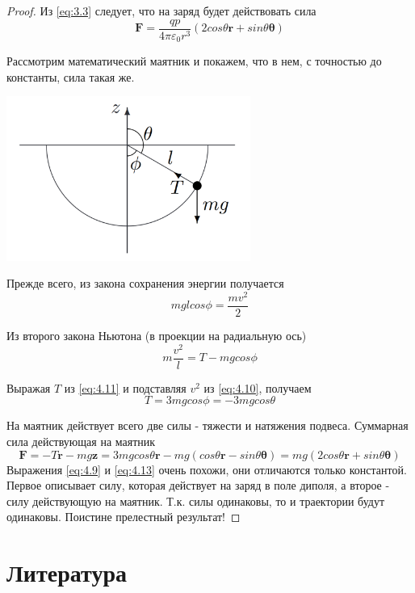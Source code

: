 \documentclass[a4paper,12pt]{article}
\newenvironment{solution}{\renewcommand{\proofname}{\unskip\indent\nopunct}\begin{proof}}{\end{proof}}
\numberwithin{equation}{section}
\begin{document}
\begin{solution}
Из \ref{eq:3.3} следует, что на заряд будет действовать сила
\begin{equation}\label{eq:4.9}
    \bm{F} = \frac{q p}{4 \pi \varepsilon_0 r^3} \left( 2 cos \theta \bm{r} + sin \theta \bm{\theta} \right)
\end{equation}

Рассмотрим математический маятник и покажем, что в нем, с точностью до константы, сила такая же.

\begin{center}
    \includegraphics[width=8cm]{3.png}
\end{center}

Прежде всего, из закона сохранения энергии получается
\begin{equation}\label{eq:4.10}
    mgl cos \phi = \frac{mv^2}{2}
\end{equation}

Из второго закона Ньютона (в проекции на радиальную ось)
\begin{equation}\label{eq:4.11}
    m \frac{v^2}{l} = T - mg cos \phi
\end{equation}

Выражая $T$ из \ref{eq:4.11} и подставляя $v^2$ из \ref{eq:4.10}, получаем
\begin{equation}
    T = 3mg cos \phi = -3mg cos \theta
\end{equation}

На маятник действует всего две силы - тяжести и натяжения подвеса.
Суммарная сила действующая на маятник
\begin{equation}\label{eq:4.13}
    \bm{F} = -T \bm{r} - mg \bm{z} = 3mg cos \theta \bm{r} - mg \left( cos \theta \bm{r} - sin \theta \bm{\theta} \right) =
    mg (2 cos \theta \bm{r} + sin \theta \bm{\theta})
\end{equation}
Выражения \ref{eq:4.9} и \ref{eq:4.13} очень похожи, они отличаются только константой.
Первое описывает силу, которая действует на заряд в поле диполя, а второе - силу действующую на маятник.
Т.к. силы одинаковы, то и траектории будут одинаковы.
Поистине прелестный результат!
\end{solution}


\section{Литература}
\renewcommand\refname{\vskip -1cm}


\end{document}
